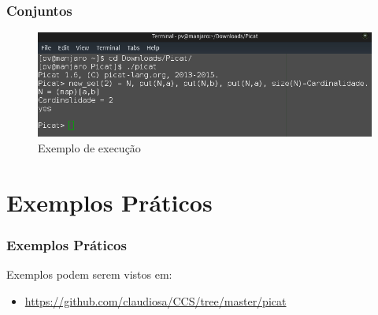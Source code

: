\documentclass[sans]{beamer}
\begin{document}

\begin{frame}[fragile]   %
\frametitle{Conjuntos}

 \begin{figure}[!ht]
 \centering
 \includegraphics[width=.9\textwidth]{picatconjuntos.png}
 \caption{Exemplo de execução}
 \end{figure}

\end{frame}


\section{Exemplos Práticos}
\begin{frame}[fragile]   %
\frametitle{Exemplos Práticos}
\begin{block}{Exemplos podem serem vistos em:}
 \begin{itemize}
  \item \url{https://github.com/claudiosa/CCS/tree/master/picat}
 \end{itemize}

\end{block}

\end{frame}

\end{document}
